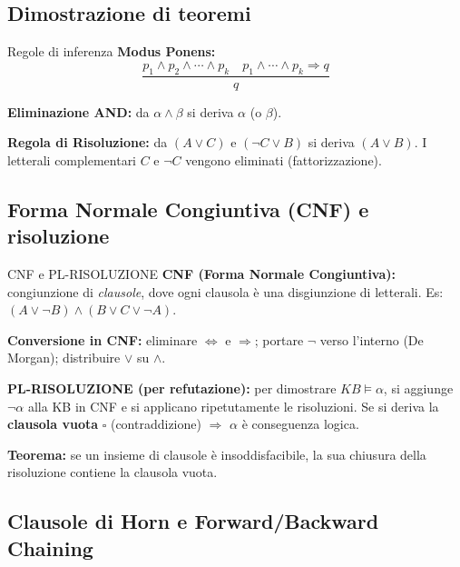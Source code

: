 \documentclass[12pt,a4paper]{article}
\begin{document}
\subsection{Dimostrazione di teoremi}

\begin{defbox}{Regole di inferenza}
\textbf{Modus Ponens:}
\[
\frac{p_1 \land p_2 \land \cdots \land p_k \quad p_1 \land \cdots \land p_k \Rightarrow q}{q}
\]

\textbf{Eliminazione AND:} da $\alpha \land \beta$ si deriva $\alpha$ (o $\beta$).

\textbf{Regola di Risoluzione:} da $(A \lor C)$ e $(\neg C \lor B)$ si deriva $(A \lor B)$. I letterali complementari $C$ e $\neg C$ vengono eliminati (fattorizzazione).
\end{defbox}

\subsection{Forma Normale Congiuntiva (CNF) e risoluzione}

\begin{defbox}{CNF e PL-RISOLUZIONE}
\textbf{CNF (Forma Normale Congiuntiva):} congiunzione di \emph{clausole}, dove ogni clausola è una disgiunzione di letterali. Es: $(A \lor \neg B) \land (B \lor C \lor \neg A)$.

\textbf{Conversione in CNF:} eliminare $\Leftrightarrow$ e $\Rightarrow$; portare $\neg$ verso l'interno (De Morgan); distribuire $\lor$ su $\land$.

\textbf{PL-RISOLUZIONE (per refutazione):} per dimostrare $KB \models \alpha$, si aggiunge $\neg\alpha$ alla KB in CNF e si applicano ripetutamente le risoluzioni. Se si deriva la \textbf{clausola vuota} $\square$ (contraddizione) $\Rightarrow$ $\alpha$ è conseguenza logica.

\textbf{Teorema:} se un insieme di clausole è insoddisfacibile, la sua chiusura della risoluzione contiene la clausola vuota.
\end{defbox}

\subsection{Clausole di Horn e Forward/Backward Chaining}
\end{document}
